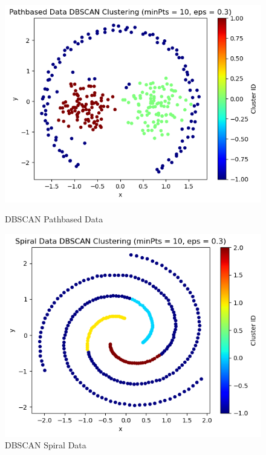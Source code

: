\documentclass{article}
\begin{document}
\begin{figure}[H]
    \centering
    \begin{minipage}[b]{0.49\textwidth}
        \centering
        \includegraphics[width=\textwidth]{DB_rand_pathbased.png}
        \caption{DBSCAN Pathbased Data}
    \end{minipage}
    \hfill
    \begin{minipage}[b]{0.49\textwidth}
        \centering
        \includegraphics[width=\textwidth]{DB_rand_spiral.png}
        \caption{DBSCAN Spiral Data}
    \end{minipage}
\end{figure}
\end{document}
